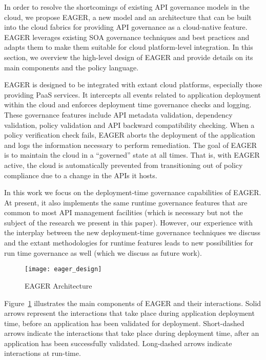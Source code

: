 In order to resolve the shortcomings of existing API governance models in the
cloud, we propose EAGER, a new model and an architecture that can be built
into the cloud fabrics for providing API governance as a cloud-native feature.
EAGER leverages existing SOA governance techniques and 
best practices and adapts them to make them
suitable for cloud platform-level integration.
In this section, we
overview the high-level design of EAGER and provide details on its main
components and the policy language.

EAGER is designed to be integrated with extant cloud platforms, 
especially those providing PaaS services. 
It intercepts all events related to application deployment within the cloud
and enforces deployment time governance checks and
logging. 
These governance features include API metadata validation, 
dependency validation, policy validation and 
API backward compatibility
checking. When a policy verification check fails, 
EAGER aborts the deployment of the application and logs the information
necessary to perform remediation.  The goal of EAGER is to maintain the cloud
in a ``governed'' state at all times.  That is, with EAGER active, the cloud
is
automatically prevented from transitioning out of policy compliance due to a
change in the APIs it hosts.

In this work we focus on the deployment-time governance capabilities of EAGER. 
At present, it also implements the same runtime governance features that are
common to most API management facilities (which is necessary but not the
subject of the research we present in this paper).
However, our experience with the interplay between the new deployment-time
governance techniques we discuss and the extant methodologies for runtime
features leads to new possibilities for run time governance as well (which we
discuss as future work).

\begin{figure}
\centering
\texttt{[image: eager\_design]}
\caption{EAGER Architecture}
\label{fig:eager_design}
\end{figure}

Figure~\ref{fig:eager_design} illustrates the main components of EAGER and
their interactions. Solid arrows represent the interactions that take place
during application deployment time, before an application has been validated
for deployment. Short-dashed arrows indicate the interactions that take place
during deployment time, after an application has been successfully validated.
Long-dashed arrows indicate interactions at run-time.

